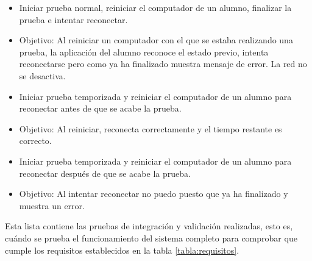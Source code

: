 \begin{itemize}
    \item Iniciar prueba normal, reiniciar el computador de un alumno, finalizar la prueba e intentar reconectar.
    \item Objetivo: Al reiniciar un computador con el que se estaba realizando una prueba, la aplicación del alumno reconoce el estado previo, intenta reconectarse pero como ya ha finalizado muestra mensaje de error. La red no se desactiva.
    \newline


    \item Iniciar prueba temporizada y reiniciar el computador de un alumno para reconectar antes de que se acabe la prueba.
    \item Objetivo: Al reiniciar, reconecta correctamente y el tiempo restante es correcto.
    \newline

    \item Iniciar prueba temporizada y reiniciar el computador de un alumno para reconectar después de que se acabe la prueba.
    \item Objetivo: Al intentar reconectar no puedo puesto que ya ha finalizado y muestra un error.
    \newline

\end{itemize}


Esta lista contiene las pruebas de integración y validación realizadas, esto es, cuándo se prueba el funcionamiento del sistema completo para comprobar que cumple los requisitos establecidos en la tabla \ref{tabla:requisitos}.
\newline

